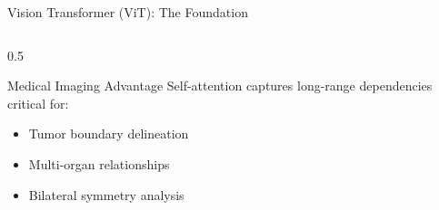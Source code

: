 \documentclass[aspectratio=169]{beamer}
\begin{document}
\begin{frame}{Vision Transformer (ViT): The Foundation}
\begin{columns}
\begin{column}{0.5\textwidth}
            \begin{alertblock}{Medical Imaging Advantage}
                Self-attention captures long-range dependencies critical for:
                \begin{itemize}
                    \item Tumor boundary delineation
                    \item Multi-organ relationships
                    \item Bilateral symmetry analysis
                \end{itemize}
            \end{alertblock}
        \end{column}
    \end{columns}
\end{frame}
\end{document}
